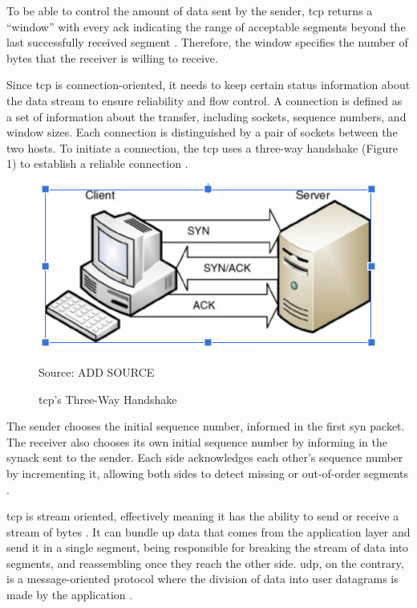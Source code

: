 To be able to control the amount of data sent by the sender, \gls{tcp} returns a “window” with every \gls{ack} indicating the range of acceptable segments beyond the last successfully received segment \cite{rfc793}. Therefore, the window specifies the number of bytes that the receiver is willing to receive.

Since \gls{tcp} is connection-oriented, it needs to keep certain status information about the data stream to ensure reliability and flow control. A connection is defined as a set of information about the transfer, including sockets, sequence numbers, and window sizes. Each connection is distinguished by a pair of sockets between the two hosts. To initiate a connection, the  \gls{tcp} uses a three-way handshake (Figure 1) to establish a reliable connection \cite{telecom_network_security}.

\begin{figure}[ht]
    \centering
    \includegraphics[width=\linewidth]{figures/tcp_handshake.png}
    \caption{\gls{tcp}’s Three-Way Handshake}
    {Source: ADD SOURCE}
    \label{figure:tcp_handshake}
\end{figure}

The sender chooses the initial sequence number, informed in the first \gls{syn} packet. The receiver also chooses its own initial sequence number by informing in the \gls{synack} sent to the sender. Each side acknowledges each other’s sequence number by incrementing it, allowing both sides to detect missing or out-of-order segments \cite{telecom_network_security}.

\gls{tcp} is stream oriented, effectively meaning it has the ability to send or receive a stream of bytes \cite{rfc793}. It can bundle up data that comes from the application layer and send it in a single segment, being responsible for breaking the stream of data into segments, and reassembling once they reach the other side. \gls{udp}, on the contrary, is a message-oriented protocol where the division of data into user datagrams is made by the application \cite{data_networks_ip}.

